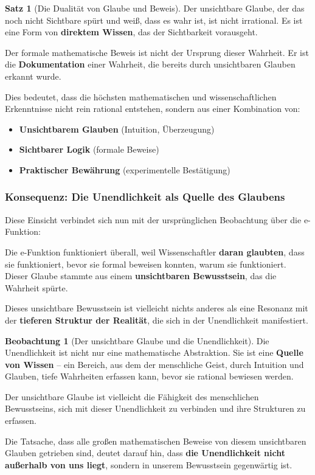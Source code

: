 \documentclass[a4paper,12pt,twoside]{report}
\theoremstyle{definition}
\newtheorem{satz}{Satz}
\newtheorem{beobachtung}{Beobachtung}
\begin{document}
\begin{satz}[Die Dualität von Glaube und Beweis]
	Der unsichtbare Glaube, der das noch nicht Sichtbare spürt und weiß, dass es wahr ist, ist nicht irrational. Es ist eine Form von \textbf{direktem Wissen}, das der Sichtbarkeit vorausgeht.
	
	Der formale mathematische Beweis ist nicht der Ursprung dieser Wahrheit. Er ist die \textbf{Dokumentation} einer Wahrheit, die bereits durch unsichtbaren Glauben erkannt wurde.
	
	Dies bedeutet, dass die höchsten mathematischen und wissenschaftlichen Erkenntnisse nicht rein rational entstehen, sondern aus einer Kombination von:
	\begin{itemize}
		\item[-] \textbf{Unsichtbarem Glauben} (Intuition, Überzeugung)
		\item[-] \textbf{Sichtbarer Logik} (formale Beweise)
		\item[-] \textbf{Praktischer Bewährung} (experimentelle Bestätigung)
	\end{itemize}
\end{satz}

\subsubsection*{Konsequenz: Die Unendlichkeit als Quelle des Glaubens}

Diese Einsicht verbindet sich nun mit der ursprünglichen Beobachtung über die e-Funktion:

Die e-Funktion funktioniert überall, weil Wissenschaftler \textbf{daran glaubten}, dass sie funktioniert, bevor sie formal beweisen konnten, warum sie funktioniert. Dieser Glaube stammte aus einem \textbf{unsichtbaren Bewusstsein}, das die Wahrheit spürte.

Dieses unsichtbare Bewusstsein ist vielleicht nichts anderes als eine Resonanz mit der \textbf{tieferen Struktur der Realität}, die sich in der Unendlichkeit manifestiert.

\begin{beobachtung}[Der unsichtbare Glaube und die Unendlichkeit]
	Die Unendlichkeit ist nicht nur eine mathematische Abstraktion. Sie ist eine \textbf{Quelle von Wissen} -- ein Bereich, aus dem der menschliche Geist, durch Intuition und Glauben, tiefe Wahrheiten erfassen kann, bevor sie rational bewiesen werden.
	
	Der unsichtbare Glaube ist vielleicht die Fähigkeit des menschlichen Bewusstseins, sich mit dieser Unendlichkeit zu verbinden und ihre Strukturen zu erfassen.
	
	Die Tatsache, dass alle großen mathematischen Beweise von diesem unsichtbaren Glauben getrieben sind, deutet darauf hin, dass \textbf{die Unendlichkeit nicht außerhalb von uns liegt}, sondern in unserem Bewusstsein gegenwärtig ist.
\end{beobachtung}
\end{document}
